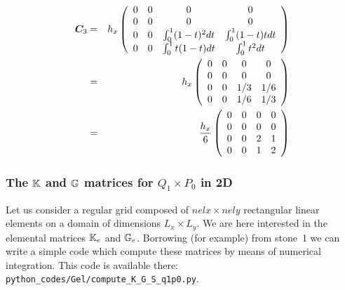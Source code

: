 \begin{eqnarray}
{\bm C}_3 
&=&
h_x
\left(
\begin{array}{cccc}
0 & 0 & 0 & 0 \\
0 & 0 & 0 & 0 \\ 
0 & 0 & \int_{0}^1 (1-t)^2 dt & \int_{0}^1 (1-t)t  dt \\
0 & 0 & \int_{0}^1 t(1-t) dt & \int_{0}^1 t^2 dt 
\end{array}
\right) \nonumber\\
&=& 
h_x
\left(
\begin{array}{cccc}
0 & 0 & 0 & 0 \\ 
0 & 0 & 0 & 0  \\
0 & 0 & 1/3 & 1/6 \\
0 & 0 & 1/6 & 1/3 
\end{array}
\right) \nonumber\\
&=& 
\frac{h_x}{6}
\left(
\begin{array}{cccc}
0 & 0 & 0 & 0 \\ 
0 & 0 & 0 & 0  \\
0 & 0 & 2 & 1 \\
0 & 0 & 1 & 2 
\end{array}
\right) 
\end{eqnarray}



\subsubsection{The ${\mathbb{K}}$ and ${\mathbb{G}}$ matrices for $Q_1 \times P_0$ in 2D \label{app:q1p0_elmats}}


Let us consider a regular grid composed of $nelx \times nely$ rectangular linear elements on a domain of dimensions $L_x\times L_y$. We are here interested in the elemental matrices ${\mathbb{K}}_e$ and ${\mathbb{G}}_e$. Borrowing (for example) from stone~1 we can write a simple code which compute these matrices by means of numerical integration. This code is available there: {\tt python\_codes/Gel/compute\_K\_G\_S\_q1p0.py}.

